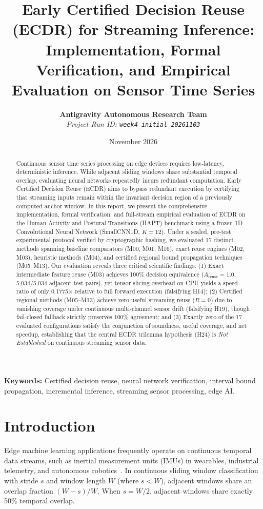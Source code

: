 \documentclass[10pt,twocolumn]{article}
\title{\textbf{Early Certified Decision Reuse (ECDR) for Streaming Inference:\\Implementation, Formal Verification, and Empirical Evaluation on Sensor Time Series}}
\author{
  \textbf{Antigravity Autonomous Research Team}\\
  \textit{Project Run ID: \texttt{week4\_initial\_20261103}}
}
\date{November 2026}
\begin{document}
\maketitle

\begin{abstract}
Continuous sensor time series processing on edge devices requires low-latency, deterministic inference. While adjacent sliding windows share substantial temporal overlap, evaluating neural networks repeatedly incurs redundant computation. Early Certified Decision Reuse (ECDR) aims to bypass redundant execution by certifying that streaming inputs remain within the invariant decision region of a previously computed anchor window. In this report, we present the comprehensive implementation, formal verification, and full-stream empirical evaluation of ECDR on the Human Activity and Postural Transitions (HAPT) benchmark using a frozen 1D Convolutional Neural Network (SmallCNN1D, $K=12$). Under a sealed, pre-test experimental protocol verified by cryptographic hashing, we evaluated 17 distinct methods spanning baseline comparators (M00, M01, M16), exact reuse engines (M02, M03), heuristic methods (M04), and certified regional bound propagation techniques (M05--M13). Our evaluation reveals three critical scientific findings: (1) Exact intermediate feature reuse (M03) achieves 100\% decision equivalence ($A_{\text{reuse}} = 1.0$, 5,034/5,034 adjacent test pairs), yet tensor slicing overhead on CPU yields a speed ratio of only 0.1775$\times$ relative to full forward execution (falsifying H14); (2) Certified regional methods (M05--M13) achieve zero useful streaming reuse ($R = 0$) due to vanishing coverage under continuous multi-channel sensor drift (falsifying H19), though fail-closed fallback strictly preserves 100\% agreement; and (3) Exactly zero of the 17 evaluated configurations satisfy the conjunction of soundness, useful coverage, and net speedup, establishing that the central ECDR trilemma hypothesis (H24) is \textit{Not Established} on continuous streaming sensor data.
\end{abstract}

\textbf{Keywords:} Certified decision reuse, neural network verification, interval bound propagation, incremental inference, streaming sensor processing, edge AI.

\section{Introduction}
Edge machine learning applications frequently operate on continuous temporal data streams, such as inertial measurement units (IMUs) in wearables, industrial telemetry, and autonomous robotics~\cite{reyes2016transition}. In continuous sliding window classification with stride $s$ and window length $W$ (where $s < W$), adjacent windows share an overlap fraction $(W - s) / W$. When $s = W/2$, adjacent windows share exactly 50\% temporal overlap.
\end{document}
